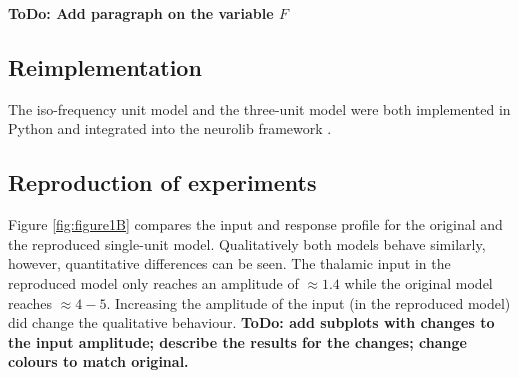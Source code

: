 \textbf{ToDo: Add paragraph on the variable $F$} 


\subsection{Reimplementation}
The iso-frequency unit model and the three-unit model were both implemented in Python and integrated into the neurolib framework 
\supercite{cakan2019neurolib}.


\subsection{Reproduction of experiments}


Figure \ref{fig:figure1B} compares the input and response profile for the original and the reproduced single-unit model. Qualitatively both models 
behave similarly, however, quantitative differences can be seen. The thalamic input in the reproduced model only reaches an amplitude of 
$\approx 1.4$ while the original model reaches $\approx 4-5$. Increasing the amplitude of the input (in the reproduced model) did change the 
qualitative behaviour. \textbf{ToDo: add subplots with changes to the input amplitude; describe the results for the changes; change colours to match
original.}

